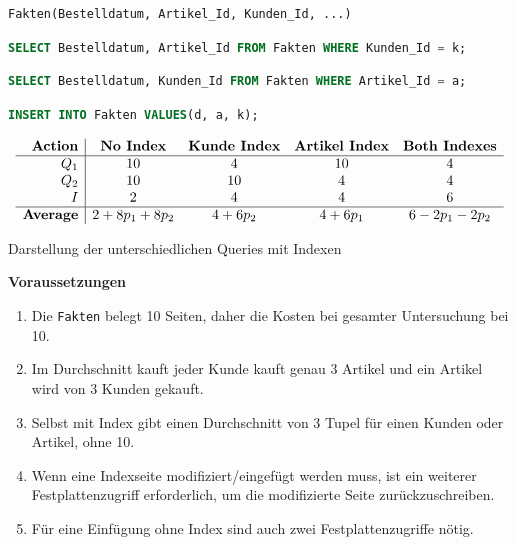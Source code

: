\begin{lstlisting}[caption=Deklaration der Beispieltabelle Fakten,label={lst:declaration-fakten}]
Fakten(Bestelldatum, Artikel_Id, Kunden_Id, ...)
\end{lstlisting}

\begin{lstlisting}[language=SQL,caption=1. Select-Query für Fakten,label={lst:fakten-select-query-kunden}]
SELECT Bestelldatum, Artikel_Id FROM Fakten WHERE Kunden_Id = k;
\end{lstlisting}

\begin{lstlisting}[language=SQL,caption=2. Select-Query für Fakten,label={lst:fakten-select-query-artikel}]
SELECT Bestelldatum, Kunden_Id FROM Fakten WHERE Artikel_Id = a;
\end{lstlisting}

\begin{lstlisting}[language=SQL,caption=Insert-Query für Fakten,label={lst:fakten-insert-query}]
INSERT INTO Fakten VALUES(d, a, k);
\end{lstlisting}

\begin{table}[h!]
    \centering
    \setlength{\arrayrulewidth}{0.4mm}
    \[
        \begin{array}{r|c c c c}
            \textbf{Action} & \textbf{No Index} & \textbf{Kunde Index} & \textbf{Artikel Index} & \textbf{Both Indexes} \\ \hline
            Q_1 & 10 & 4 & 10 & 4 \\
            Q_2 & 10 & 10 & 4 & 4 \\
            I   & 2  & 4  & 4  & 6 \\ \hline
            \textbf{Average} & 2 + 8p_1 + 8p_2 & 4 + 6p_2 & 4 + 6p_1 & 6 - 2p_1 - 2p_2 \\
        \end{array}
    \]
    \caption[Performance-Vergleich]{Darstellung der unterschiedlichen Queries mit Indexen}
    \label{tab:performance-queries}
\end{table}

\textbf{Voraussetzungen}
\begin{enumerate}
    \item Die \texttt{Fakten} belegt 10 Seiten, daher die Kosten bei gesamter Untersuchung bei 10.
    \item Im Durchschnitt kauft jeder Kunde kauft genau 3 Artikel und ein Artikel wird von 3 Kunden gekauft.
    \item Selbst mit Index gibt einen Durchschnitt von 3 Tupel für einen Kunden oder Artikel, ohne 10.
    \item Wenn eine Indexseite modifiziert/eingefügt werden muss, ist ein weiterer Festplattenzugriff erforderlich, um die modifizierte Seite zurückzuschreiben.
    \item Für eine Einfügung ohne Index sind auch zwei Festplattenzugriffe nötig.
\end{enumerate}

